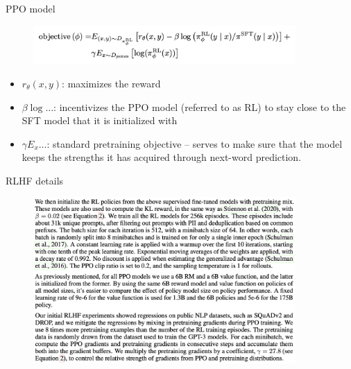 \begin{vbframe}{PPO model}


\begin{figure}
\centering
\includegraphics[width = 10cm]{figure/objectiveppo.png}
\end{figure}


\begin{itemize}
\item $r_\theta(x,y)$: maximizes the reward
  \item $\beta \log \ldots$: incentivizes the PPO model
    (referred to as RL) to stay close to the SFT model that
    it is initialized with 
    \item $\gamma E_x \ldots$: standard
      pretraining objective -- serves to make sure
      that the model keeps the strengths it has acquired
      through next-word prediction.
\end{itemize}



\vfill

\end{vbframe}


\begin{vbframe}{RLHF details}


\begin{figure}
\centering
\includegraphics[width = 10cm]{figure/rlhfdetails.png}
\end{figure}



\vfill

\end{vbframe}




